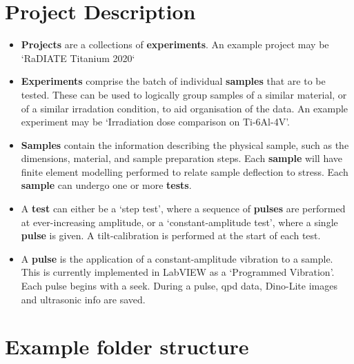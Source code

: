 \documentclass{article}
\begin{document}
\section*{Project Description}

\begin{itemize}
  \item{
    \textbf{Projects} are a collections of \textbf{experiments}.
    An example project may be `RaDIATE Titanium 2020`
  }
  \item{
    \textbf{Experiments} comprise the batch of individual \textbf{samples} that are to be tested.
    These can be used to logically group samples of a similar material, or of a similar irradation condition, to aid organisation of the data.
    An example experiment may be `Irradiation dose comparison on Ti-6Al-4V'.
  }
  \item{
    \textbf{Samples} contain the information describing the physical sample, such as the dimensions, material, and sample preparation steps.
    Each \textbf{sample} will have finite element modelling performed to relate sample deflection to stress.
    Each \textbf{sample} can undergo one or more \textbf{tests}.
  }
  \item{
    A \textbf{test} can either be a `step test', where a sequence of \textbf{pulses} are performed at ever-increasing amplitude, or a `constant-amplitude test', where a single \textbf{pulse} is given.
    A tilt-calibration is performed at the start of each test.
  }
  \item{
    A \textbf{pulse} is the application of a constant-amplitude vibration to a sample.
    This is currently implemented in LabVIEW as a `Programmed Vibration'.
    Each pulse begins with a seek.
    During a pulse, qpd data, Dino-Lite images and ultrasonic info are saved. 
  }  
\end{itemize}

\section*{Example folder structure}

\end{document}
